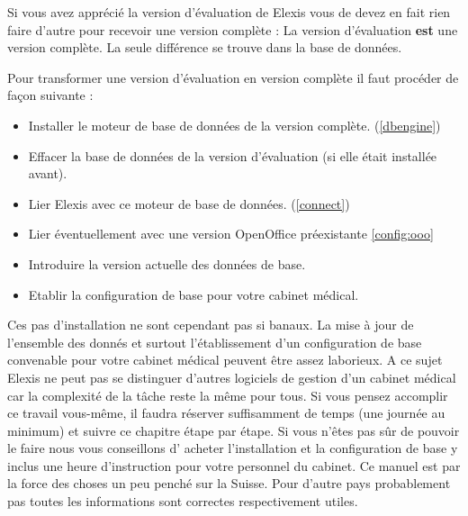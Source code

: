 
\label{vollversion}
Si vous avez apprécié la version d'évaluation de Elexis vous de devez en fait rien faire d'autre pour recevoir une version complète : La version d'évaluation \textbf{est} une version complète. La seule différence se trouve dans la base de données.

Pour transformer une version d'évaluation en version complète il faut procéder de façon suivante :
\begin{itemize}
  \item \glqq Installer  \grqq{}le moteur de base de données de la version complète. (\ref{dbengine})
  \item Effacer la base de données de la version d'évaluation (si elle était installée avant).
  \item Lier Elexis avec ce moteur de base de données.  (\ref{connect})
  \item Lier éventuellement avec une version OpenOffice préexistante  \ref{config:ooo}
  \item Introduire la version actuelle des données de base.
  \item Etablir la configuration de base pour votre cabinet médical.

\end{itemize}
Ces pas d'installation ne sont cependant pas si banaux. La mise à jour de l'ensemble des donnés et surtout l'établissement d'un configuration de base convenable pour votre cabinet médical peuvent être assez laborieux. A ce sujet Elexis ne peut pas se distinguer d'autres logiciels de gestion d'un cabinet médical car la complexité de la tâche reste la même pour tous.
Si vous pensez accomplir ce travail vous-même, il faudra réserver suffisamment de temps (une journée au minimum) et suivre ce chapitre étape par étape.
Si vous n'êtes pas sûr de pouvoir le faire nous vous conseillons d' acheter l'installation et la configuration de base y inclus une heure d'instruction pour votre personnel du cabinet.
Ce manuel est par la force des choses un peu penché sur la Suisse. Pour d'autre pays probablement pas toutes les informations sont correctes respectivement utiles.
\bigskip

